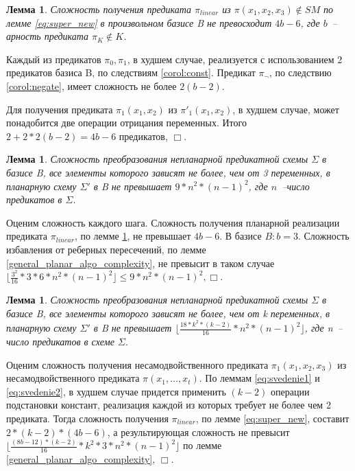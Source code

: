 \documentclass[12pt]{article}
\newtheorem{lemma}[theorem]{Лемма}
\newenvironment{proof}[1][Доказательство]{\begin{trivlist}
\item[\hskip \labelsep {\bfseries #1}]}{\end{trivlist}}
\begin{document}
\begin{lemma}
\label{complexity}
Сложность получения предиката $\pi_{linear}$ из $\pi(x_1, x_2, x_3) \notin SM$ по лемме \ref{eq:super_new}
в произвольном базисе B не 
превосходит $4b - 6$, где $b$~-- арность предиката $\pi_K \notin K$.
\end{lemma}
\begin{proof}
Каждый из предикатов $\pi_0, \pi_1$, в худшем случае, реализуется с использованием 2 предикатов базиса B,
по следствиям \ref{corol:const}. Предикат $\pi_{\neg}$, по следствию \ref{corol:negate}, имеет сложность не более $2(b-2)$.

Для получения предиката  $\pi_1(x_1, x_2)$ из $\pi'_1(x_1, x_2)$, в худшем случае, может понадобится 
две операции отрицания переменных.
Итого $2 + 2 * 2(b-2) = 4b - 6$ предикатов, $\Box$.
\end{proof}

\begin{lemma}
Сложность преобразования непланарной предикатной схемы $\Sigma$ в базисе B, 
все элементы которого зависят не более, чем от 3 переменных, 
в планарную схему $\Sigma'$ в B не превышает $9 * n^2 * (n-1)^2$, где $n$~--число предикатов в $\Sigma$.
\end{lemma}
\begin{proof}
Оценим сложность каждого шага. Сложность получения планарной реализации предиката $\pi_{linear}$, по лемме \ref{complexity},
не превышает $4b - 6$. В базисе $B: b=3$. Сложность избавления от реберных пересечений, по лемме \ref{general_planar_algo_complexity}, не 
превысит в таком случае $\lfloor \frac{3^2}{16} * 3 * 6 * n^2 * (n-1)^2 \rfloor \le 9 * n^2 * (n-1)^2, \Box$.
\end{proof}

\begin{lemma}
Сложность преобразования непланарной предикатной схемы $\Sigma$ в базисе B, 
все элементы которого зависят не более, чем от k переменных, 
в планарную схему $\Sigma'$ в B не превышает $\lfloor \frac{18 * k^2 * (k-2)}{16} * n^2 * (n-1)^2 \rfloor$, где n~-- число предикатов в схеме $\Sigma$.
\end{lemma}
\begin{proof}
Оценим сложность получения несамодвойственного предиката $\pi_1(x_1, x_2, x_3)$ из несамодвойственного предиката
$\pi(x_1, \dots, x_t)$. По леммам \ref{eq:svedenie1} и \ref{eq:svedenie2}, в худшем случае придется применить $(k-2)$ 
операции подстановки констант, реализация каждой из которых требует не более чем 2 предиката.
Тогда сложность получения $\pi_{linear}$, по лемме \ref{eq:super_new}, составит $2 * (k-2) * (4b - 6)$, а
результирующая сложность не превысит $\lfloor \frac{(8b - 12) * (k-2)}{16} * k^2 * 3 * n^2 * (n-1)^2 \rfloor $ по лемме 
\ref{general_planar_algo_complexity}, $\Box$.
\end{proof}
\end{document}
